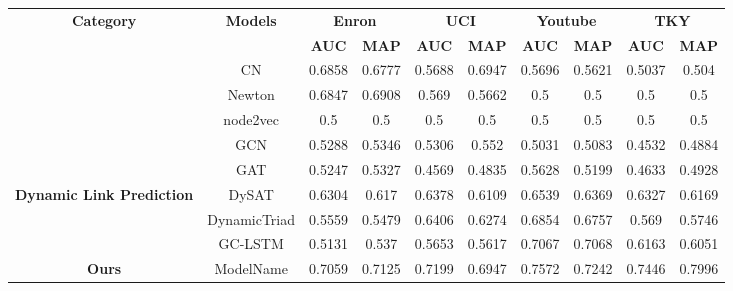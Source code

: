 \begin{table}[H]
	\centering
	\footnotesize
	\begin{tabular}{c|c|cc|cc|cc|cc}
		\toprule
		\multirow{2}{*}{\textbf{Category}} &
		\multirow{2}{*}{\textbf{Models}} &
		\multicolumn{2}{c|}{\textbf{Enron}} &
		\multicolumn{2}{c|}{\textbf{UCI}} &
		\multicolumn{2}{c|}{\textbf{Youtube}} &
		\multicolumn{2}{c}{\textbf{TKY}} \\
		&            & \textbf{AUC}    & \textbf{MAP}    & \textbf{AUC}    & \textbf{MAP}    & \textbf{AUC}    & \textbf{MAP}    & \textbf{AUC}    & \textbf{MAP}    \\ \midrule
		\multirowcell{3}{\textbf{Heuristics methods}} &
		CN &	0.6858 &	0.6777 &	0.5688 &	0.6947 &	0.5696 &	0.5621 &	0.5037 &	0.504 \\
		& Newton       & 0.6847 & 0.6908 & 0.569  & 0.5662 & 0.5    & 0.5    & 0.5    & 0.5    \\
		\multirowcell{4.5}{\textbf{Static Link   Prediction}} & node2vec     & 0.5    & 0.5    & 0.5    & 0.5    & 0.5    & 0.5    & 0.5    & 0.5    \\ \midrule
		& GCN          & 0.5288 & 0.5346 & 0.5306 & 0.552  & 0.5031 & 0.5083 & 0.4532 & 0.4884 \\
		& GAT          & 0.5247 & 0.5327 & 0.4569 & 0.4835 & 0.5628 & 0.5199 & 0.4633 & 0.4928 \\ \midrule
		\multirow{3}{*}{\textbf{Dynamic Link   Prediction}} &
		DySAT &0.6304 &	0.617 &	0.6378 &	0.6109 &	0.6539 &	0.6369 &	0.6327 &	0.6169 \\
		& DynamicTriad & 0.5559 & 0.5479 & 0.6406 & 0.6274 & 0.6854 & 0.6757 & 0.569  & 0.5746 \\
		& GC-LSTM      & 0.5131 & 0.537  & 0.5653 & 0.5617 & 0.7067 & 0.7068 & 0.6163 & 0.6051 \\ \midrule
		\textbf{Ours}                                      & ModelName    & 0.7059 & 0.7125 & 0.7199 & 0.6947 & 0.7572 & 0.7242 & 0.7446 & 0.7996\\ \bottomrule
	\end{tabular}
\end{table}
\setlength{\abovecaptionskip}{0cm}
\setlength{\belowcaptionskip}{-0.2cm}
